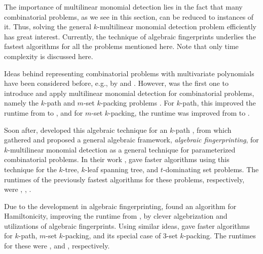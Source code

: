 
The importance of multilinear monomial detection lies in the fact 
that many combinatorial problems, as we see in this section, 
can be reduced to instances of it. 
Thus, solving the general $k$-multilinear monomial detection problem 
efficiently has great interest. 
Currently, the technique of algebraic fingerprints underlies the fastest algorithms 
for all the problems mentioned here. 
Note that only time complexity is discussed here. 

Ideas behind representing combinatorial problems with multivariate polynomials have 
been considered before, e.g., by \citeauthor{Valiant92} \cite{Valiant92} and 
\citeauthor{Koutis05} \cite{Koutis05}. However, 
\citeauthor{Koutis08} was the first one to introduce and apply multilinear monomial 
detection for combinatorial problems, namely the $k$-path and $m$-set $k$-packing problems 
\cite{Koutis08}. For $k$-path, this improved the runtime from 
 \cite{Chen07} to , and for $m$-set $k$-packing, 
the runtime was improved from  \cite{Koutis05} to .

Soon after, \citeauthor{Williams09} developed this algebraic technique 
for an  $k$-path \cite{Williams09}, 
from which \citeauthor{KouWil09} \cite{KouWil09, KouWil15} 
gathered and proposed a general 
 algebraic framework, 
\emph{algebraic fingerprinting}, for $k$-multilinear monomial detection 
as a general technique for 
parameterized combinatorial problems. In their work \cite{KouWil09}, 
\citeauthor{KouWil09} gave faster  algorithms using this technique for the 
$k$-tree, $k$-leaf spanning tree, and $t$-dominating set problems. %
The runtimes of the previously fastest algorithms for these problems, respectively, were   
 \cite{Alon95},  \cite{Kneis11},  \cite{Kneis07}. 

Due to the development in algebraic fingerprinting, 
\citeauthor{Björklund14} \cite{Björklund14} found an  algorithm for 
Hamiltonicity, improving the runtime from  \cite{Bellman62, HelKar62}, 
by clever algebrization and utilizations of algebraic fingerprints. Using similar 
ideas, \citeauthor{Björklund17} \cite{Björklund17} gave faster algorithms for 
$k$-path, $m$-set $k$-packing, and its special case of 3-set $k$-packing. 
The runtimes for these were ,  and , respectively.

